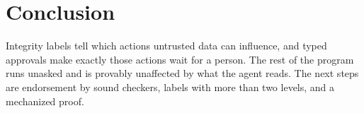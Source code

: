 \documentclass[acmsmall,nonacm,screen]{acmart}
\begin{document}
\section{Conclusion}

Integrity labels tell which actions untrusted data can influence, and typed approvals make
exactly those actions wait for a person. The rest of the program runs unasked and is provably
unaffected by what the agent reads. The next steps are endorsement by sound checkers, labels
with more than two levels, and a mechanized proof.



\end{document}
